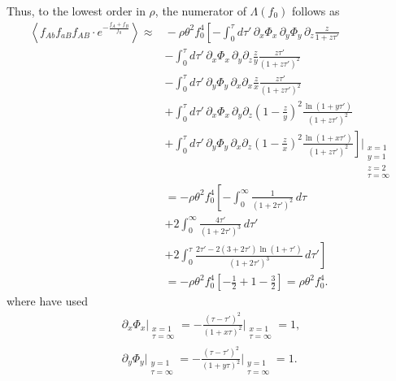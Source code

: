 \documentclass[11pt]{article}
\begin{document}
Thus, to the lowest order in $\rho$, the numerator of $\Lambda(f_0)$ follows as
\begin{align}\label{eq:lambda_num_contribution}
    \left\langle f_{Ab}f_{aB}f_{AB}\cdot e^{-\frac{f_{A}+f_{B}}{f_0}}\right\rangle \approx&{} -\rho \theta^2 f_0^4 \left[
    -\int_0^{\tau} d\tau'\, \partial_x \Phi_x \, \partial_y \Phi_y \, \partial_z \frac{z}{1+z\tau'} \right. \\\nonumber
    &- \left. \int_0^{\tau} d\tau'\, \partial_x \Phi_x \, \partial_y \partial_z \frac{z}{y} \frac{z\tau'}{(1+z\tau')^2} \right. \\\nonumber
    &- \left. \int_0^{\tau} d\tau'\, \partial_y \Phi_y \, \partial_x \partial_x \frac{z}{x} \frac{z\tau'}{(1+z\tau')^2} \right. \\\nonumber
    &+ \left. \int_0^{\tau} d\tau'\, \partial_x \Phi_x \, \partial_y \partial_z \left(1-\frac{z}{y}\right)^2 \frac{\ln(1+y\tau')}{(1+z\tau')^2} \right. \\\nonumber
    &+ \left. \int_0^{\tau} d\tau'\, \partial_y \Phi_y \, \partial_x \partial_z \left(1-\frac{z}{x}\right)^2 \frac{\ln(1+x\tau')}{(1+z\tau')^2} 
    \right]\Bigg\vert_{\substack{x=1 \\ y=1 \\ z=2 \\ \tau=\infty}} \\ \nonumber
    &= -\rho \theta^2 f_0^4 \left[
    -\int_0^{\infty} \frac{1}{(1+2\tau')^2}\,d\tau  \right. \\ \nonumber
    &+ \left. 2 \int_0^{\infty} \frac{4\tau'}{(1+2\tau')^3} \,d\tau' \right. \\ \nonumber
    &+ \left. 2 \int_0^{\tau} \frac{2\tau'-2(3+2\tau')\ln(1+\tau')}{(1+2\tau')^3} \,d\tau' \right] \\ \nonumber
    &= -\rho \theta^2 f_0^4 \left[-\frac{1}{2} + 1 - \frac{3}{2}\right] = \rho \theta^2 f_0^4.
\end{align}
where have used
\begin{subequations}\begin{align}
    \partial_x \Phi_x \Bigg\vert_{\substack{x=1 \\ \tau=\infty}} = 
    -\frac{(\tau-\tau')^2}{(1+x\tau)^2} \Bigg\vert_{\substack{x=1 \\ \tau=\infty}} = 1, \\
    \partial_y \Phi_y \Bigg\vert_{\substack{y=1 \\ \tau=\infty}} =
    -\frac{(\tau-\tau')^2}{(1+y\tau)^2} \Bigg\vert_{\substack{y=1 \\ \tau=\infty}} = 1.
\end{align}\end{subequations}
\end{document}
